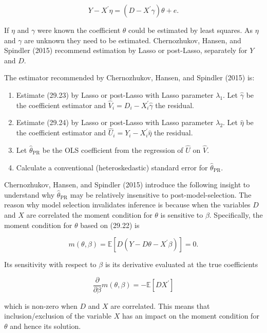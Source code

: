 \documentclass[10pt]{article}
\begin{document}
$$
Y-X^{\prime} \eta=\left(D-X^{\prime} \gamma\right) \theta+e .
$$

If $\eta$ and $\gamma$ were known the coefficient $\theta$ could be estimated by least squares. As $\eta$ and $\gamma$ are unknown they need to be estimated. Chernozhukov, Hansen, and Spindler (2015) recommend estimation by Lasso or post-Lasso, separately for $Y$ and $D$.

The estimator recommended by Chernozhukov, Hansen, and Spindler (2015) is:

\begin{enumerate}
  \item Estimate (29.23) by Lasso or post-Lasso with Lasso parameter $\lambda_{1}$. Let $\widehat{\gamma}$ be the coefficient estimator and $\widehat{V}_{i}=D_{i}-X_{i}^{\prime} \widehat{\gamma}$ the residual.

  \item Estimate (29.24) by Lasso or post-Lasso with Lasso parameter $\lambda_{2}$. Let $\widehat{\eta}$ be the coefficient estimator and $\widehat{U}_{i}=Y_{i}-X_{i}^{\prime} \widehat{\eta}$ the residual.

  \item Let $\widehat{\theta}_{\mathrm{PR}}$ be the OLS coefficient from the regression of $\widehat{U}$ on $\widehat{V}$.

  \item Calculate a conventional (heteroskedastic) standard error for $\widehat{\theta}_{\mathrm{PR}}$.

\end{enumerate}

Chernozhukov, Hansen, and Spindler (2015) introduce the following insight to understand why $\widehat{\theta}_{\mathrm{PR}}$ may be relatively insensitive to post-model-selection. The reason why model selection invalidates inference is because when the variables $D$ and $X$ are correlated the moment condition for $\theta$ is sensitive to $\beta$. Specifically, the moment condition for $\theta$ based on (29.22) is

$$
m(\theta, \beta)=\mathbb{E}\left[D\left(Y-D \theta-X^{\prime} \beta\right)\right]=0 .
$$

Its sensitivity with respect to $\beta$ is its derivative evaluated at the true coefficients

$$
\frac{\partial}{\partial \beta} m(\theta, \beta)=-\mathbb{E}\left[D X^{\prime}\right]
$$

which is non-zero when $D$ and $X$ are correlated. This means that inclusion/exclusion of the variable $X$ has an impact on the moment condition for $\theta$ and hence its solution.
\end{document}
